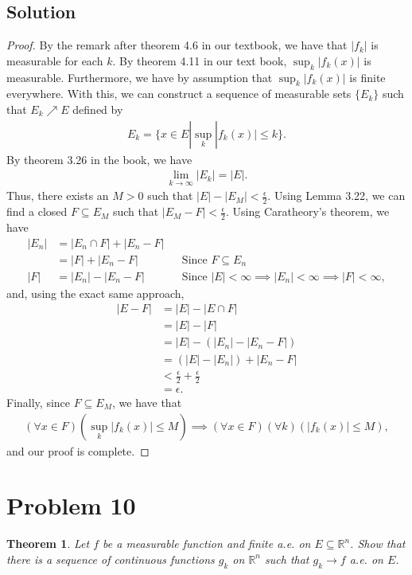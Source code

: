 \documentclass[10pt,a4paper]{article}
\theoremstyle{theorem}
\newtheorem{theorem}{Theorem}
\theoremstyle{definition}
\begin{document}
\subsection*{Solution}
\begin{proof}
By the remark after theorem 4.6 in our textbook, we have that $|f_k|$ is measurable for each $k$. By theorem 4.11 in our text book, $\sup_k |f_k(x)|$ is measurable.  Furthermore, we have by assumption that $\sup_k |f_k(x)|$ is finite everywhere. With this, we can construct a sequence of measurable sets $\{E_k\}$ such that $E_k \nearrow E$ defined by
\begin{align*}
E_k = \{x \in E | \sup_k |f_k(x)| \leq k \}.
\end{align*}
By theorem 3.26 in the book, we have
\begin{align*}
\lim_{k \to \infty} |E_k| = |E|.
\end{align*}
Thus, there exists an $M > 0$ such that 
$|E| - |E_M| < \frac{\epsilon}{2}$. Using Lemma 3.22, we can find a closed $F \subseteq E_M$ such that $|E_M - F| < \frac{\epsilon}{2}$. Using Caratheory's theorem, we have
\begin{align*}
|E_n| &= |E_n \cap F| + |E_n - F|\\
&= |F| + |E_n - F| && \text{Since } F \subseteq E_n\\
|F| &= |E_n| - |E_n - F| &&\text{Since } |E| < \infty \implies |E_n| < \infty \implies |F| < \infty,
\end{align*}
and, using the exact same approach,
\begin{align*}
|E - F| &= |E| - |E \cap F|\\
&= |E| - |F|\\
&= |E| - (|E_n| - |E_n - F| )\\
&= (|E| - |E_n|) + |E_n - F|\\
&< \frac{\epsilon}{2} + \frac{\epsilon}{2}\\
&= \epsilon.
\end{align*}
Finally, since $F \subseteq E_M$, we have that 
\begin{align*}
(\forall x \in F)(\sup_k |f_k(x)| \leq M) \implies (\forall x \in F)(\forall k)(|f_k(x)| \leq M),
\end{align*}
and our proof is complete.
\end{proof}

\section*{Problem 10}
\begin{theorem}
Let $f$ be a measurable function and finite a.e. on $E \subseteq \mathbb{R}^n$. Show that there is a sequence of continuous functions $g_k$ on $\mathbb{R}^n$ such that $g_k \to f$ a.e. on $E$.
\end{theorem}
\end{document}

